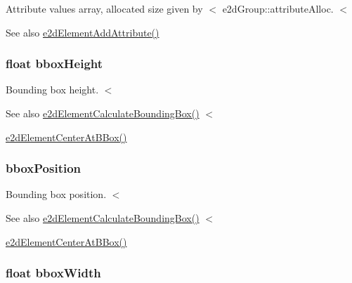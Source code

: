 Attribute values array, allocated size given by $<$ e2d\-Group\-::attribute\-Alloc. $<$ \begin{DoxySeeAlso}{See also}
\hyperlink{group__e2d_element_ga5cfa0a343d3dd1a30b0addc4ec6e7f88}{e2d\-Element\-Add\-Attribute()} 
\end{DoxySeeAlso}
\hypertarget{structe2d_element_a680d0d4219ac8720005c46b55a9676ae}{
\subsubsection[{bbox\-Height}]{\setlength{\rightskip}{0pt plus 5cm}float {\bf bbox\-Height}}}\label{structe2d_element_a680d0d4219ac8720005c46b55a9676ae}
Bounding box height. $<$ \begin{DoxySeeAlso}{See also}
\hyperlink{group__e2d_element_ga94aa710b2da71af2091fe4d5b87ce47e}{e2d\-Element\-Calculate\-Bounding\-Box()} $<$ 

\hyperlink{group__e2d_element_ga36b01a888c97163c990e16d348aff61c}{e2d\-Element\-Center\-At\-B\-Box()} 
\end{DoxySeeAlso}
\hypertarget{structe2d_element_ac2c17ce4cba805b594b314a77923cbf5}{
\subsubsection[{bbox\-Position}]{ {\bf bbox\-Position}}}\label{structe2d_element_ac2c17ce4cba805b594b314a77923cbf5}
Bounding box position. $<$ \begin{DoxySeeAlso}{See also}
\hyperlink{group__e2d_element_ga94aa710b2da71af2091fe4d5b87ce47e}{e2d\-Element\-Calculate\-Bounding\-Box()} $<$ 

\hyperlink{group__e2d_element_ga36b01a888c97163c990e16d348aff61c}{e2d\-Element\-Center\-At\-B\-Box()} 
\end{DoxySeeAlso}
\hypertarget{structe2d_element_a6a1d9b223870deeaec7f5e8b23ca4b22}{
\subsubsection[{bbox\-Width}]{\setlength{\rightskip}{0pt plus 5cm}float {\bf bbox\-Width}}}\label{structe2d_element_a6a1d9b223870deeaec7f5e8b23ca4b22}
